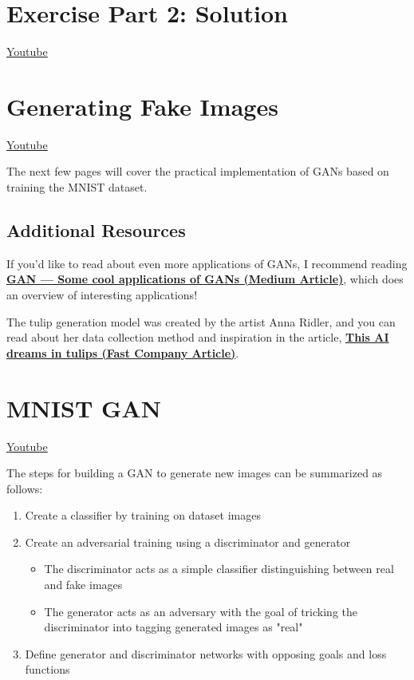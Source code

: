 

\section{Exercise Part 2: Solution}
\href{https://www.youtube.com/watch?v=wudXk5nPWgM}{Youtube}

\section{Generating Fake Images}
\href{https://www.youtube.com/watch?v=7KI4yITZLBk}{Youtube} \newline

The next few pages will cover the practical implementation of GANs based on training the MNIST dataset.

\subsection{Additional Resources}
If you'd like to read about even more applications of GANs, I recommend reading \href{https://medium.com/@jonathan_hui/gan-some-cool-applications-of-gans-4c9ecca35900}{\textbf{GAN — Some cool applications of GANs (Medium Article)}}, which does an overview of interesting applications! \newline

The tulip generation model was created by the artist Anna Ridler, and you can read about her data collection method and inspiration in the article, \href{https://www.fastcompany.com/90237233/this-ai-dreams-in-tulips}{\textbf{This AI dreams in tulips (Fast Company Article)}}.

\section{MNIST GAN}
\href{https://www.youtube.com/watch?v=g2CDYdc18Jg&t=1s}{Youtube} \newline

The steps for building a GAN to generate new images can be summarized as follows:

\begin{enumerate}
    \item Create a classifier by training on dataset images
    \item Create an adversarial training using a discriminator and generator
    \begin{itemize}
        \item The discriminator acts as a simple classifier distinguishing between real and fake images
        \item The generator acts as an adversary with the goal of tricking the discriminator into tagging generated images as "real"
    \end{itemize}
    \item Define generator and discriminator networks with opposing goals and loss functions
\end{enumerate}

